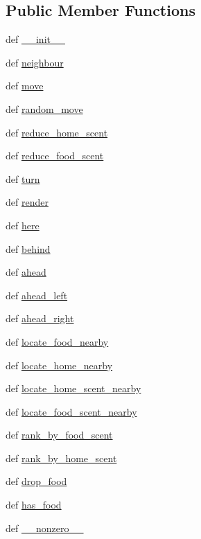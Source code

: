 \subsection*{Public Member Functions}
\begin{DoxyCompactItemize}
\item 
def \hyperlink{classants_1_1Ant_a0fa15b6ba2860b445d390c07bc11d4e2}{\+\_\+\+\_\+init\+\_\+\+\_\+}
\item 
def \hyperlink{classants_1_1Ant_a2ddd97dadaa5d24c459b0117dc6e1190}{neighbour}
\item 
def \hyperlink{classants_1_1Ant_a0067159f23e5e9e4b3564d48c1564f11}{move}
\item 
def \hyperlink{classants_1_1Ant_a3a636b900b6fdbed032e3a635495a4c4}{random\+\_\+move}
\item 
def \hyperlink{classants_1_1Ant_a216ebc2ce2dfeb88d6bbc714bc50ecb5}{reduce\+\_\+home\+\_\+scent}
\item 
def \hyperlink{classants_1_1Ant_a285d1e406b6d2cc67779e873e879feb0}{reduce\+\_\+food\+\_\+scent}
\item 
def \hyperlink{classants_1_1Ant_a445ec1d1f8e4cb539c4f66fafa129131}{turn}
\item 
def \hyperlink{classants_1_1Ant_a95585d833c74c56155a0d79394d511cc}{render}
\item 
def \hyperlink{classants_1_1Ant_a2e60480b7534b107e12d7f23fd06d5f1}{here}
\item 
def \hyperlink{classants_1_1Ant_a192f8411faa05c48db8db99d033f5d15}{behind}
\item 
def \hyperlink{classants_1_1Ant_ac2c8f048d99cd48a5829ddf7ff4a708a}{ahead}
\item 
def \hyperlink{classants_1_1Ant_a2dbb07eefeecbc51d257f81fb0ba1c71}{ahead\+\_\+left}
\item 
def \hyperlink{classants_1_1Ant_ad7a5311d831e8bcc07061e6a12edad8c}{ahead\+\_\+right}
\item 
def \hyperlink{classants_1_1Ant_af9af7f8a5c766021ef0f68171d09abca}{locate\+\_\+food\+\_\+nearby}
\item 
def \hyperlink{classants_1_1Ant_a5795d0898e3d0d020a0a0a626a5ef7b0}{locate\+\_\+home\+\_\+nearby}
\item 
def \hyperlink{classants_1_1Ant_a81a141f3417ddb32b8d1abbd95bbc477}{locate\+\_\+home\+\_\+scent\+\_\+nearby}
\item 
def \hyperlink{classants_1_1Ant_a97ffad1c0e634f38585e7913908e9524}{locate\+\_\+food\+\_\+scent\+\_\+nearby}
\item 
def \hyperlink{classants_1_1Ant_a164a2a76f1779462fe81e8f169a92a93}{rank\+\_\+by\+\_\+food\+\_\+scent}
\item 
def \hyperlink{classants_1_1Ant_a6f3e3bd98a5f382098cdc1c02e1e2fd0}{rank\+\_\+by\+\_\+home\+\_\+scent}
\item 
def \hyperlink{classants_1_1Ant_ae85884312b4aa10f965b84535bed37fc}{drop\+\_\+food}
\item 
def \hyperlink{classants_1_1Ant_a41de1c29941a444dab25a88cbc3a881d}{has\+\_\+food}
\item 
def \hyperlink{classants_1_1Ant_a9e4bf6309b80ab33bd628f6e7d78d013}{\+\_\+\+\_\+nonzero\+\_\+\+\_\+}
\end{DoxyCompactItemize}
